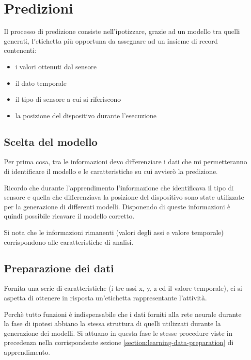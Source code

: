 \section{Predizioni}
Il processo di predizione consiste nell'ipotizzare, grazie ad un modello tra quelli generati, 
l'etichetta più opportuna da assegnare ad un insieme di record contenenti:
\begin{itemize}
    \item i valori ottenuti dal sensore
    \item il dato temporale
    \item il tipo di sensore a cui si riferiscono
    \item la posizione del dispositivo durante l'esecuzione
\end{itemize}


\subsection{Scelta del modello}
Per prima cosa, tra le informazioni devo differenziare i dati che mi permetteranno di identificare il modello e le caratteristiche 
su cui avvierò la predizione.

Ricordo che durante l'apprendimento l'informazione che identificava il tipo di sensore e quella che differenziava 
la posizione del dispositivo sono state utilizzate per la generazione di differenti modelli.
Disponendo di queste informazioni è quindi possibile ricavare il modello corretto.

Si nota che le informazioni rimanenti (valori degli assi e valore temporale) corrispondono alle caratteristiche di analisi.


\subsection{Preparazione dei dati}
Fornita una serie di caratteristiche (i tre assi x, y, z ed il valore temporale), ci si aspetta di ottenere 
in risposta un'etichetta rappresentante l'attività.

\vspace{5mm} %

Perchè tutto funzioni è indispensabile che i dati forniti alla rete neurale durante la fase di ipotesi 
abbiano la stessa struttura di quelli utilizzati durante la generazione dei modelli.
Si attuano in questa fase le stesse procedure viste in precedenza nella corrispondente sezione 
\ref{section:learning-data-preparation} di apprendimento.

